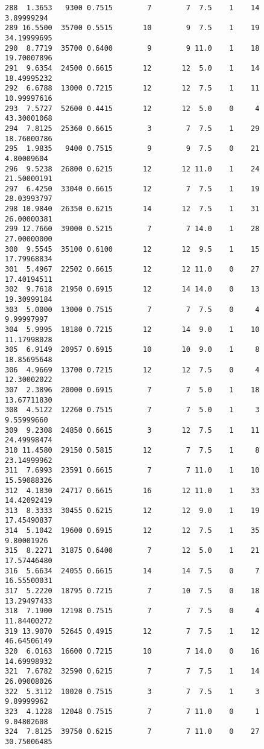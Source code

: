 \documentclass[
  letterpaper,
  DIV=11,
  numbers=noendperiod]{scrreprt}
\begin{document}
\begin{verbatim}
288  1.3653   9300 0.7515        7        7  7.5    1    14  3.89999294
289 16.5500  35700 0.5515       10        9  7.5    1    19 34.19999695
290  8.7719  35700 0.6400        9        9 11.0    1    18 19.70007896
291  9.6354  24500 0.6615       12       12  5.0    1    14 18.49995232
292  6.6788  13000 0.7215       12       12  7.5    1    11 10.99997616
293  7.5727  52600 0.4415       12       12  5.0    0     4 43.30001068
294  7.8125  25360 0.6615        3        7  7.5    1    29 18.76000786
295  1.9835   9400 0.7515        9        9  7.5    0    21  4.80009604
296  9.5238  26800 0.6215       12       12 11.0    1    24 21.50000191
297  6.4250  33040 0.6615       12        7  7.5    1    19 28.03993797
298 10.9840  26350 0.6215       14       12  7.5    1    31 26.00000381
299 12.7660  39000 0.5215        7        7 14.0    1    28 27.00000000
300  9.5545  35100 0.6100       12       12  9.5    1    15 17.79968834
301  5.4967  22502 0.6615       12       12 11.0    0    27 17.40194511
302  9.7618  21950 0.6915       12       14 14.0    0    13 19.30999184
303  5.0000  13000 0.7515        7        7  7.5    0     4  9.99997997
304  5.9995  18180 0.7215       12       14  9.0    1    10 11.17998028
305  6.9149  20957 0.6915       10       10  9.0    1     8 18.85695648
306  4.9669  13700 0.7215       12       12  7.5    0     4 12.30002022
307  2.3896  20000 0.6915        7        7  5.0    1    18 13.67711830
308  4.5122  12260 0.7515        7        7  5.0    1     3  9.55999660
309  9.2308  24850 0.6615        3       12  7.5    1    11 24.49998474
310 11.4580  29150 0.5815       12        7  7.5    1     8 23.14999962
311  7.6993  23591 0.6615        7        7 11.0    1    10 15.59088326
312  4.1830  24717 0.6615       16       12 11.0    1    33 14.42092419
313  8.3333  30455 0.6215       12       12  9.0    1    19 17.45490837
314  5.1042  19600 0.6915       12       12  7.5    1    35  9.80001926
315  8.2271  31875 0.6400        7       12  5.0    1    21 17.57446480
316  5.6634  24055 0.6615       14       14  7.5    0     7 16.55500031
317  5.2220  18795 0.7215        7       10  7.5    0    18 13.29497433
318  7.1900  12198 0.7515        7        7  7.5    0     4 11.84400272
319 13.9070  52645 0.4915       12        7  7.5    1    12 46.64506149
320  6.0163  16600 0.7215       10        7 14.0    0    16 14.69998932
321  7.6782  32590 0.6215        7        7  7.5    1    14 26.09008026
322  5.3112  10020 0.7515        3        7  7.5    1     3  9.89999962
323  4.1228  12048 0.7515        7        7 11.0    0     1  9.04802608
324  7.8125  39750 0.6215        7        7 11.0    0    27 30.75006485

\end{verbatim}
\end{document}
